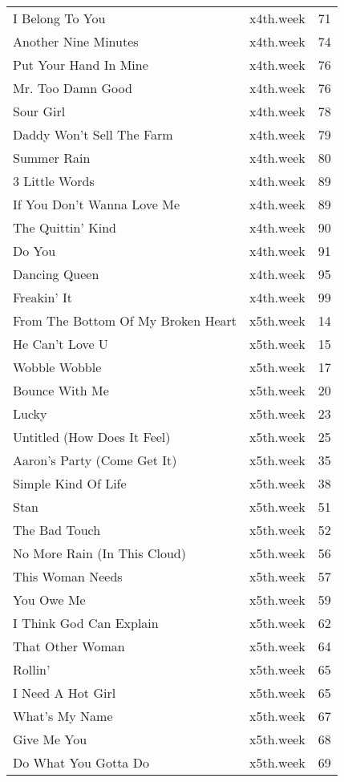 \begin{table}[ht]
\begin{tabular}{llr}
  I Belong To You & x4th.week &  71 \\ 
  Another Nine Minutes & x4th.week &  74 \\ 
  Put Your Hand In Mine & x4th.week &  76 \\ 
  Mr. Too Damn Good & x4th.week &  76 \\ 
  Sour Girl & x4th.week &  78 \\ 
  Daddy Won't Sell The Farm & x4th.week &  79 \\ 
  Summer Rain & x4th.week &  80 \\ 
  3 Little Words & x4th.week &  89 \\ 
  If You Don't Wanna Love Me & x4th.week &  89 \\ 
  The Quittin' Kind & x4th.week &  90 \\ 
  Do You & x4th.week &  91 \\ 
  Dancing Queen & x4th.week &  95 \\ 
  Freakin' It & x4th.week &  99 \\ 
  From The Bottom Of My Broken Heart & x5th.week &  14 \\ 
  He Can't Love U & x5th.week &  15 \\ 
  Wobble Wobble & x5th.week &  17 \\ 
  Bounce With Me & x5th.week &  20 \\ 
  Lucky & x5th.week &  23 \\ 
  Untitled (How Does It Feel) & x5th.week &  25 \\ 
  Aaron's Party (Come Get It) & x5th.week &  35 \\ 
  Simple Kind Of Life & x5th.week &  38 \\ 
  Stan & x5th.week &  51 \\ 
  The Bad Touch & x5th.week &  52 \\ 
  No More Rain (In This Cloud) & x5th.week &  56 \\ 
  This Woman Needs & x5th.week &  57 \\ 
  You Owe Me & x5th.week &  59 \\ 
  I Think God Can Explain & x5th.week &  62 \\ 
  That Other Woman & x5th.week &  64 \\ 
  Rollin' & x5th.week &  65 \\ 
  I Need A Hot Girl & x5th.week &  65 \\ 
  What's My Name & x5th.week &  67 \\ 
  Give Me You & x5th.week &  68 \\ 
  Do What You Gotta Do & x5th.week &  69 \\ 

\end{tabular}
\end{table}
